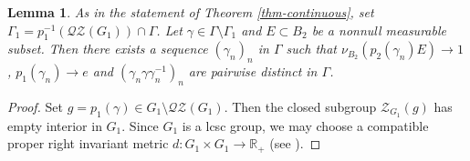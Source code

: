 \documentclass[JEP,XML,SOM,Unicode,published]{cedram}
\newtheorem{lem}[thm]{Lemma}
\theoremstyle{definition}
\newcommand{\R}{\mathbb{R}}
\begin{document}
\begin{lem}\label{lem-sequence}
As in the statement of Theorem \ref{thm-continuous}, set $\Gamma_1 = p_1^{-1}(\mathscr{Q}\mathscr{Z}(G_1)) \cap \Gamma$.
Let $\gamma \in \Gamma \setminus \Gamma_1$ and $E \subset B_2$ be a nonnull measurable subset. Then there exists a sequence $(\gamma_n)_{n}$ in $\Gamma$ such that $\nu_{B_2}(p_2(\gamma_n) E) \to 1$, $p_1(\gamma_n) \to e$ and $(\gamma_n \gamma \gamma_n^{-1})_{n}$ are pairwise distinct in $\Gamma$.
\end{lem}

\begin{proof}
Set $g = p_1(\gamma) \in G_1\setminus \mathscr{Q}\mathscr{Z}(G_1)$. Then the closed subgroup $\mathscr Z_{G_1}(g)$ has empty interior in $G_1$. Since $G_1$ is a lcsc group, we may choose a compatible proper right invariant metric $d : G_1 \times G_1 \to \R_+$ (see \eg \cite{St73}).


\end{proof}
\end{document}
